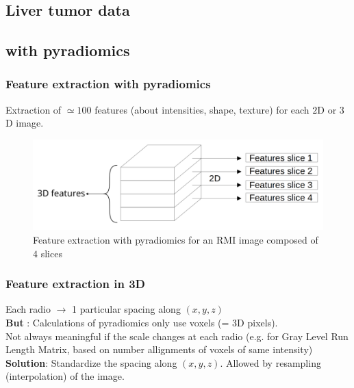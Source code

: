 \documentclass{beamer}
\begin{document}
\begin{frame}
    \section{Liver tumor data}
    \subsection{with pyradiomics}
\end{frame}

\begin{frame}
    \frametitle{Feature extraction with pyradiomics \cite{pyradio}}
    Extraction of $\simeq  100$ features (about intensities, shape, texture) for each $2$D or $3$D image.\\[10 pt]
    \begin{figure}
        \centering
        \includegraphics[scale = 0.15]{images/features.png}
        \caption{Feature extraction with pyradiomics for an RMI image composed of $4$ slices}
    \end{figure}
\end{frame}

\begin{frame}
    \frametitle{Feature extraction in 3D}
    Each radio $\rightarrow$ 1 particular spacing along $(x,y,z)$\\[10 pt]
    \textbf{But} : Calculations of pyradiomics only use voxels (= 3D pixels).\\[10 pt]
    Not always meaningful if the scale changes at each radio (e.g. for Gray Level Run Length Matrix, based on number allignments of voxels of same intensity)\\[10 pt]
    \textbf{Solution}: Standardize the spacing along $(x,y,z)$. Allowed by resampling (interpolation) of the image.
\end{frame}
\end{document}
